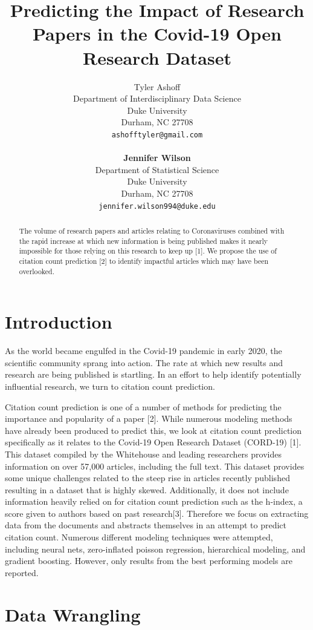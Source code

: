 \documentclass{article} %
\title{Predicting the Impact of Research Papers in the Covid-19 Open Research Dataset}
\author{
Tyler Ashoff \\
Department of Interdisciplinary Data Science\\
Duke University\\
Durham, NC 27708 \\
\texttt{ashofftyler@gmail.com} \\
\\
\textbf{Jennifer Wilson} \\
Department of Statistical Science\\
Duke University\\
Durham, NC 27708 \\
\texttt{jennifer.wilson994@duke.edu} \\
}
\begin{document}
\maketitle



\begin{abstract}
The volume of research papers and articles relating to Coronaviruses combined with the rapid increase at which new information is being published makes it nearly impossible for those relying on this research to keep up [1]. We propose the use of citation count prediction [2] to identify impactful articles which may have been overlooked.
\end{abstract}

\section{Introduction}

As the world became engulfed in the Covid-19 pandemic in early 2020, the scientific community sprang into action. The rate at which new results and research are being published is startling. In an effort to help identify potentially influential research, we turn to citation count prediction.

Citation count prediction is one of a number of methods for predicting the importance and popularity of a paper [2]. While numerous modeling methods have already been produced to predict this, we look at citation count prediction specifically as it relates to the Covid-19 Open Research Dataset (CORD-19) [1]. This dataset compiled by the Whitehouse and leading researchers provides information on over 57,000 articles, including the full text. This dataset provides some unique challenges related to the steep rise in articles recently published resulting in a dataset that is highly skewed. Additionally, it does not include information heavily relied on for citation count prediction such as the h-index, a score given to authors based on past research[3]. Therefore we focus on extracting data from the documents and abstracts themselves in an attempt to predict citation count. Numerous different modeling techniques were attempted, including neural nets, zero-inflated poisson regression, hierarchical modeling, and gradient boosting. However, only results from the best performing models are reported. 

\section{Data Wrangling}
\end{document}

